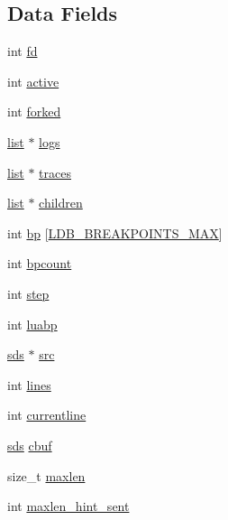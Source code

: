\subsection*{Data Fields}
\begin{DoxyCompactItemize}
\item 
int \hyperlink{structldb_state_a6f8059414f0228f0256115e024eeed4b}{fd}
\item 
int \hyperlink{structldb_state_aa5805c5e936174e5092bf7a5b78e7e64}{active}
\item 
int \hyperlink{structldb_state_a561d6ae2df1882124024d1ad25c05ca0}{forked}
\item 
\hyperlink{structlist}{list} $\ast$ \hyperlink{structldb_state_ad79d8838634104cbd0a2cc989b41017c}{logs}
\item 
\hyperlink{structlist}{list} $\ast$ \hyperlink{structldb_state_a306571a8cb6864a49170a1d0ef814347}{traces}
\item 
\hyperlink{structlist}{list} $\ast$ \hyperlink{structldb_state_a6bc412879e51bdab8e86acf420095ef9}{children}
\item 
int \hyperlink{structldb_state_ac9df7cc923c5d2a35bfc27dd8530b9af}{bp} \mbox{[}\hyperlink{scripting_8c_a4f3000cf3b5955f8134bfcd2fa340db3}{L\+D\+B\+\_\+\+B\+R\+E\+A\+K\+P\+O\+I\+N\+T\+S\+\_\+\+M\+AX}\mbox{]}
\item 
int \hyperlink{structldb_state_a472140f37a2e6de6a1a4cd2fce742d78}{bpcount}
\item 
int \hyperlink{structldb_state_abc16e65f240ed0c8f3e876e8732c0a33}{step}
\item 
int \hyperlink{structldb_state_a74c70212af9085c6d321fa9ac33ae44c}{luabp}
\item 
\hyperlink{sds_8h_ad69abac3df4532879db9642c95f5ef6f}{sds} $\ast$ \hyperlink{structldb_state_ae6aed5a52abc1fc9c7945db6ce185a7d}{src}
\item 
int \hyperlink{structldb_state_a9921ae02cadccc99dd6c3a9b68be050a}{lines}
\item 
int \hyperlink{structldb_state_a1be7dfac6c204d2592700475b5d73fd2}{currentline}
\item 
\hyperlink{sds_8h_ad69abac3df4532879db9642c95f5ef6f}{sds} \hyperlink{structldb_state_a3d56df85c9742c537178642bc4ee7355}{cbuf}
\item 
size\+\_\+t \hyperlink{structldb_state_a7eb7af5917b25bcb6565ab20f7a12d22}{maxlen}
\item 
int \hyperlink{structldb_state_a30be56c3b354bdb2e4d39a105be4e1bd}{maxlen\+\_\+hint\+\_\+sent}
\end{DoxyCompactItemize}


